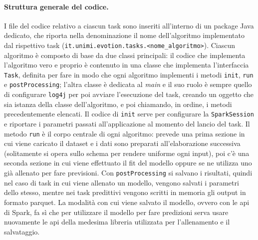 \documentclass[12pt,a4paper,fleqn,titlepage]{report}
\begin{document}
        \paragraph{Struttura generale del codice.}
        I file del codice relativo a ciascun task sono inseriti all'interno di un package Java dedicato, che riporta nella denominazione il nome dell'algoritmo implementato dal rispettivo task (\lstinline{it.unimi.evotion.tasks.<nome_algoritmo>}).
        Ciascun algoritmo è composto di base da due classi principali: il codice che implementa l'algoritmo vero e proprio è contenuto in una classe che implementa l'interfaccia \lstinline{Task}, definita per fare in modo che ogni algoritmo implementi i metodi \lstinline{init}, \lstinline{run} e \lstinline{postProcessing}; l'altra classe è dedicata al \emph{main} e il suo ruolo è sempre quello di configurare \lstinline{log4j} per poi avviare l'esecuzione del task, creando un oggetto che sia istanza della classe dell'algoritmo, e poi chiamando, in ordine, i metodi precedentemente elencati.
        Il codice di \lstinline{init} serve per configurare la \lstinline{SparkSession} e riportare i parametri passati all'applicazione al momento del lancio del task. Il metodo \lstinline{run} è il corpo centrale di ogni algoritmo: prevede una prima sezione in cui viene caricato il dataset e i dati sono preparati all'elaborazione successiva (solitamente si opera sullo schema per rendere uniforme ogni input), poi c'è una seconda sezione in cui viene effettuato il fit del modello oppure se ne utilizza uno già allenato per fare previsioni. Con \lstinline{postProcessing} si salvano i risultati, quindi nel caso di task in cui viene allenato un modello, vengono salvati i parametri dello stesso, mentre nei task predittivi vengono scritti in memoria gli output in formato parquet. La modalità con cui viene salvato il modello, ovvero con le \gls{api} di Spark, fa sì che per utilizzare il modello per fare predizioni serva usare nuovamente le \gls{api} della medesima libreria utilizzata per l'allenamento e il salvataggio.
\end{document}
